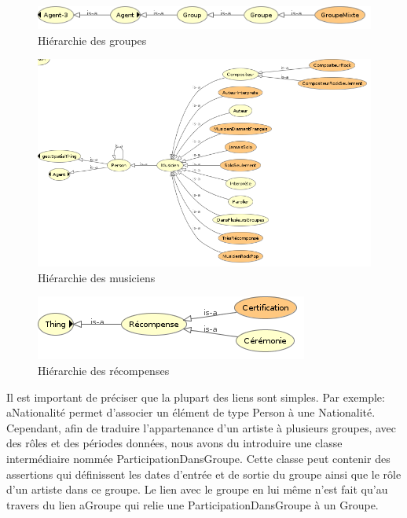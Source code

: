 \documentclass{article}
\begin{document}
\begin{figure}[H]
    \center
    \includegraphics[scale=.5]{img/groupe.png}
    \caption{Hiérarchie des groupes}
\end{figure}

\begin{figure}[H]
    \center
    \includegraphics[scale=.5]{img/musicien.png}
    \caption{Hiérarchie des musiciens}
\end{figure}

\begin{figure}[H]
    \center
    \includegraphics[scale=.5]{img/recompense.png}
    \caption{Hiérarchie des récompenses}
\end{figure}

Il est important de préciser que la plupart des liens sont simples. Par exemple: \textsf{aNationalité} permet d'associer un élément de type \textsf{Person} à une \textsf{Nationalité}. Cependant, afin de traduire l'appartenance d'un artiste à plusieurs groupes, avec des rôles et des périodes données, nous avons du introduire une classe intermédiaire nommée \textsf{ParticipationDansGroupe}. Cette classe peut contenir des assertions qui définissent les dates d'entrée et de sortie du groupe ainsi que le rôle d'un artiste dans ce groupe. Le lien avec le groupe en lui même n'est fait qu'au travers du lien \textsf{aGroupe} qui relie une \textsf{ParticipationDansGroupe} à un \textsf{Groupe}.\\
\end{document}
